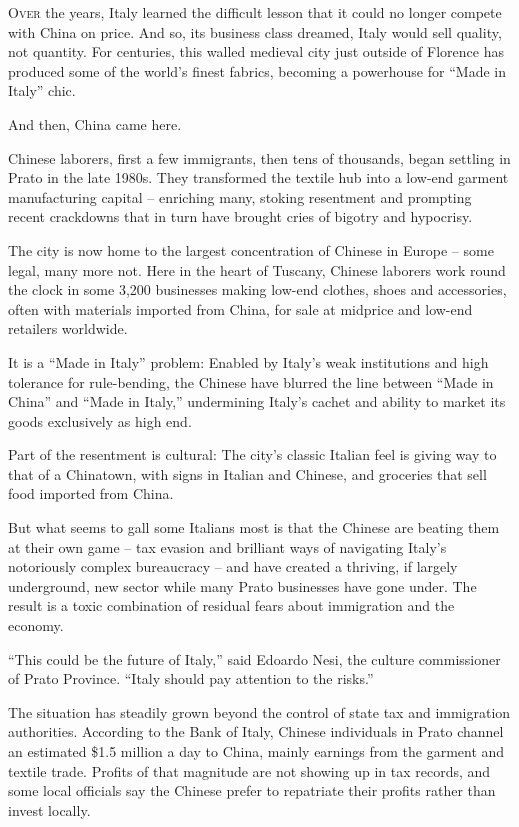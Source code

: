 ﻿\documentclass[12pt]{article}
\begin{document}
\lettrine{O}{ver} the years, Italy learned the difficult lesson that it
could no longer compete with China on price. And so, its business class dreamed, Italy would sell
quality, not quantity. For centuries, this walled medieval city just outside of Florence has
produced some of the world's finest fabrics, becoming a powerhouse for ``Made in Italy'' chic.

And then, China came here.

Chinese laborers, first a few immigrants, then tens of thousands, began settling in Prato in the
late 1980s. They transformed the textile hub into a low-end garment manufacturing capital --
enriching many, stoking resentment and prompting recent crackdowns that in turn have brought cries
of bigotry and hypocrisy.

The city is now home to the largest concentration of Chinese in Europe -- some legal, many more not.
Here in the heart of Tuscany, Chinese laborers work round the clock in some 3,200 businesses making
low-end clothes, shoes and accessories, often with materials imported from China, for sale at
midprice and low-end retailers worldwide.

It is a ``Made in Italy'' problem: Enabled by Italy's weak institutions and high tolerance for
rule-bending, the Chinese have blurred the line between ``Made in China'' and ``Made in Italy,''
undermining Italy's cachet and ability to market its goods exclusively as high end.

Part of the resentment is cultural: The city's classic Italian feel is giving way to that of a
Chinatown, with signs in Italian and Chinese, and groceries that sell food imported from China.

But what seems to gall some Italians most is that the Chinese are beating them at their own game --
tax evasion and brilliant ways of navigating Italy's notoriously complex bureaucracy -- and have
created a thriving, if largely underground, new sector while many Prato businesses have gone under.
The result is a toxic combination of residual fears about immigration and the economy.

``This could be the future of Italy,'' said Edoardo Nesi, the culture commissioner of Prato
Province. ``Italy should pay attention to the risks.''

The situation has steadily grown beyond the control of state tax and immigration authorities.
According to the Bank of Italy, Chinese individuals in Prato channel an estimated \$1.5 million a
day to China, mainly earnings from the garment and textile trade. Profits of that magnitude are not
showing up in tax records, and some local officials say the Chinese prefer to repatriate their
profits rather than invest locally.
\end{document}
